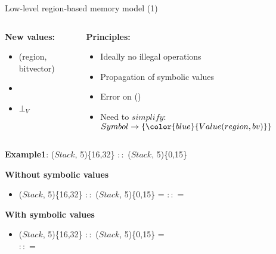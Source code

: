 \begin{frame}{Low-level region-based memory model (1)}
    \begin{columns}[t]
     \begin{column}[T]{3.7cm}
      \textbf{New values:}
      \begin{scriptsize}
      \begin{itemize}
      \item (region, bitvector)
      \item \textbf{\color{blue}{Symbol}}
      \item $\bot_V$
      \end{itemize}
      \end{scriptsize}   
     \end{column}
     \pause
     \begin{column}[T]{6cm}
      \textbf{Principles:}
      \begin{tiny}
      \begin{itemize}
      \item Ideally no illegal operations
      \item Propagation of symbolic values
      \item Error on (\texttt{\color{red}{load, store, jump, ite}})
      \item Need to $simplify:$ $Symbol \rightarrow \lbrace {\color{blue}{Value(region, bv)}} \rbrace$    
      \end{itemize}
      \end{tiny}
     \end{column}
     \end{columns}
     \pause
     \bigskip
      \textbf{Example1}:  ($Stack$, 5)\{16,32\} $::$ ($Stack$, 5)\{0,15\}

      \medskip

      \textbf {Without symbolic values}
      \begin{itemize}
      \item ($Stack$, 5)\{16,32\} $::$ ($Stack$, 5)\{0,15\} = {\color{red}{$\bot_V$}} $::$ {\color{red}{$\bot_V$}} = {\color{red}{$\bot_V$}}
      \end{itemize}
      \pause
      \medskip

      \textbf{With symbolic values}
      \begin{itemize}
      \item ($Stack$, 5)\{16,32\} $::$ ($Stack$, 5)\{0,15\}  = \\ {\color{blue}{Restrict(($Stack$, 5), 16,32)}} $::$ {\color{blue}{Restrict(($Stack$, 5),0,15)}} = \\ {\color{red}{($Stack$, 5)}}
      \end{itemize}
\end{frame}


